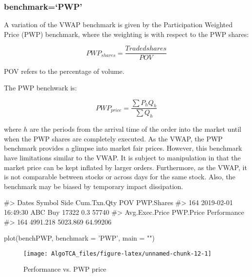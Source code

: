 \hypertarget{benchmarkpwp}{%
\subsubsection{benchmark=`PWP'}\label{benchmarkpwp}}

A variation of the VWAP benchmark is given by the Participation Weighted
Price (PWP) benchmark, where the weighting is with respect to the PWP
shares:

\[ PWP_{shares} = \frac{Traded shares}{POV} \]

POV refers to the percentage of volume.

The PWP benchwark is:

\[ PWP_{price} = \frac{\sum {P_{h}Q_{h}}}{\sum {Q_{h}}} \]

where \(h\) are the periods from the arrival time of the order into the
market until when the PWP shares are completely executed. As the VWAP,
the PWP benchmark provides a glimpse into market fair prices. However,
this benchmark have limitations similar to the VWAP. It is subject to
manipulation in that the market price can be kept inflated by larger
orders. Furthermore, as the VWAP, it is not comparable between stocks or
across days for the same stock. Also, the benchmark may be biased by
temporary impact dissipation.

\begin{Schunk}
\begin{Soutput}
#>                   Dates Symbol Side Cum.Txn.Qty POV PWP.Shares
#> 164 2019-02-01 16:49:30    ABC  Buy       17322 0.3      57740
#>     Avg.Exec.Price PWP.Price Performance
#> 164       4991.218  5023.869    64.99206
\end{Soutput}
\begin{Sinput}
plot(benchPWP, benchmark = 'PWP', main = "")
\end{Sinput}
\begin{figure}

{\centering \texttt{[image: AlgoTCA\_files/figure-latex/unnamed-chunk-12-1]} 

}

\caption[Performance vs]{Performance vs. PWP price}\label{fig:unnamed-chunk-12}
\end{figure}
\end{Schunk}

